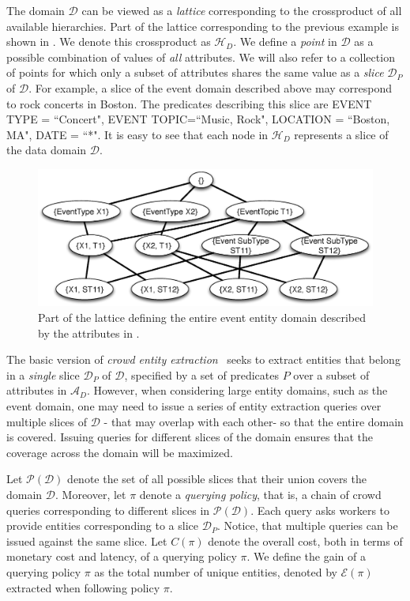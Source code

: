 \documentclass{sig-alternate}
\newcommand{\domain}{\mathcal{D}}
\newcommand{\attributes}{\mathcal{A}_D}
\newcommand{\hierarchy}{\mathcal{H}_D}
\newcommand{\uentities}{\mathcal{E}}
\begin{document}
The domain $\domain$ can be viewed as a {\em lattice} corresponding to the crossproduct of all available hierarchies. Part of the lattice corresponding to the previous example is shown in . We denote this crossproduct as $\hierarchy$. We define a {\em point} in $\domain$ as a possible combination of values of {\em all} attributes. We will also refer to a collection of points for which only a subset of attributes shares the same value as a {\em slice} $\domain_P$ of $\domain$. For example, a slice of the event domain described above may correspond to rock concerts in Boston. The predicates describing this slice are EVENT TYPE = ``Concert", EVENT TOPIC=``Music, Rock", LOCATION = ``Boston, MA", DATE = ``*".  It is easy to see that each node in $\hierarchy$ represents a slice of the data domain $\domain$. 

\begin{figure}
	\begin{center}
	\includegraphics[clip,scale=0.35]{figs/eventsExLattice.eps}
	\caption{Part of the lattice defining the entire event entity domain described by the attributes in .}
	\label{fig:eventslattice}
	\end{center}
\end{figure}

The basic version of {\em crowd entity extraction}~\cite{trushkowsky:2013} seeks to extract entities that belong in a {\em single} slice $\domain_P$ of $\domain$, specified by a set of predicates $P$ over a subset of attributes in $\attributes$. However, when considering large entity domains, such as the event domain, one may need to issue a series of entity extraction queries over multiple slices of $\domain$ - that may overlap with each other- so that the entire domain is covered. Issuing queries for different slices of the domain ensures that the coverage across the domain will be maximized. 

Let $\mathcal{P}(\domain)$ denote the set of all possible slices that their union covers the domain $\domain$. Moreover, let $\pi$ denote a {\em querying policy}, that is, a chain of crowd queries corresponding to different slices in $\mathcal{P}(\domain)$. Each query asks workers to provide entities corresponding to a slice $\domain_P$. Notice, that multiple queries can be issued against the same slice. Let $C(\pi)$ denote the overall cost, both in terms of monetary cost and latency, of a querying policy $\pi$. We define the gain of a querying policy $\pi$ as the total number of unique entities, denoted by $\uentities(\pi)$ extracted when following policy $\pi$. 
\end{document}
